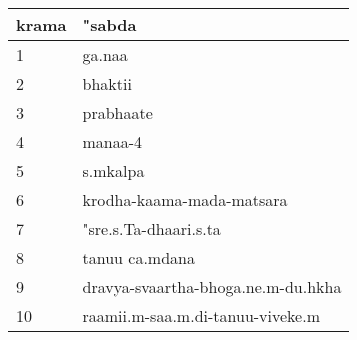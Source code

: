 \documentclass[a4paper]{article}
\begin{document}
\begin{tabular}{|l|l|}
\hline
krama & "sabda\\
\hline
1 & ga.naa \\
\hline
2 & bhaktii \\
\hline
3 & prabhaate \\
\hline
4 & manaa-4 \\
\hline
5 & s.mkalpa \\
\hline
6 & krodha-kaama-mada-matsara \\
\hline
7 & "sre.s.Ta-dhaari.s.ta \\
\hline
8 & tanuu ca.mdana\\
\hline
9 & dravya-svaartha-bhoga.ne.m-du.hkha\\
\hline
10 & raamii.m-saa.m.di-tanuu-viveke.m\\
\hline
\end{tabular}
        
\end{document}

